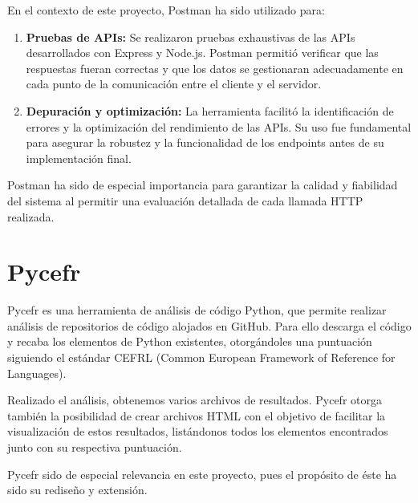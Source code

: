 \documentclass[a4paper, 12pt]{book}
\begin{document}
En el contexto de este proyecto, Postman ha sido utilizado para:

\begin{enumerate}
    \item \textbf{Pruebas de APIs:} Se realizaron pruebas exhaustivas de las APIs desarrollados con Express y Node.js. Postman permitió verificar que las respuestas fueran correctas y que los datos se gestionaran adecuadamente en cada punto de la comunicación entre el cliente y el servidor.
    \item \textbf{Depuración y optimización:} La herramienta facilitó la identificación de errores y la optimización del rendimiento de las APIs. Su uso fue fundamental para asegurar la robustez y la funcionalidad de los endpoints antes de su implementación final.
\end{enumerate}

Postman ha sido de especial importancia para garantizar la calidad y fiabilidad del sistema al permitir una evaluación detallada de cada llamada HTTP realizada.

\section{Pycefr}

Pycefr es una herramienta de análisis de código Python, que permite realizar análisis de repositorios de código alojados en GitHub. Para ello descarga el código y recaba los elementos de Python existentes, otorgándoles una puntuación siguiendo el estándar CEFRL (Common European Framework of Reference for Languages).

Realizado el análisis, obtenemos varios archivos de resultados. Pycefr otorga también la posibilidad de crear archivos HTML con el objetivo de facilitar la visualización de estos resultados, listándonos todos los elementos encontrados junto con su respectiva puntuación.

Pycefr sido de especial relevancia en este proyecto, pues el propósito de éste ha sido su rediseño y extensión.


\label{sec:seccion1}

\end{document}
